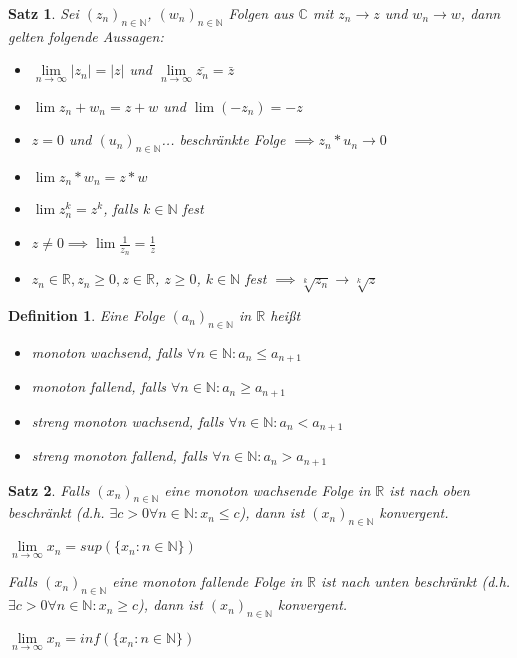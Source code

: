 \documentclass[twocolumn]{article}
\newtheorem{theorem}{Satz}[section]
\newtheorem{definition}{Definition}[section]
\begin{document}
\begin{theorem}
	Sei $(z_n)_{n \in \mathbb{N}}$, $(w_n)_{n \in \mathbb{N}}$ Folgen aus $\mathbb{C}$ mit $z_n \rightarrow z$ und $w_n \rightarrow w$, dann gelten folgende Aussagen:
	
	\begin{itemize}
		\item $\lim\limits_{n\rightarrow \infty}|z_n|=|z|$ und $\lim\limits_{n\rightarrow \infty}\bar{z_n}=\bar{z}$
		
		\item $\lim z_n + w_n = z+w$ und $\lim (-z_n)=-z$
		
		\item $z = 0$ und $(u_n)_{n \in \mathbb{N}}$... beschränkte Folge $\implies z_n * u_n \rightarrow 0$
		
		\item $\lim z_n * w_n = z*w$
		
		\item $\lim z_n^k = z^k$, falls $k \in \mathbb{N}$ fest
		
		\item $z \neq 0 \implies \lim \frac{1}{z_n}=\frac{1}{z}$
		
		\item $z_n \in \mathbb{R}, z_n \geq 0, z \in \mathbb{R}$, $z \geq 0$, $k \in \mathbb{N}$ fest $\implies \sqrt[k]{z_n}\rightarrow \sqrt[k]{z}$
	\end{itemize}
\end{theorem}

\begin{definition}
	Eine Folge $(a_n)_{n \in \mathbb{N}}$ in $\mathbb{R}$ heißt
	
	\begin{itemize}
		\item monoton wachsend, falls $\forall n \in \mathbb{N} : a_n \leq a_{n+1}$
		\item monoton fallend, falls $\forall n \in \mathbb{N} : a_n \geq a_{n+1}$
		\item streng monoton wachsend, falls $\forall n \in \mathbb{N} : a_n < a_{n+1}$
		\item streng monoton fallend, falls $\forall n \in \mathbb{N} : a_n > a_{n+1}$
	\end{itemize}
\end{definition}

\begin{theorem}
	Falls $(x_n)_{n \in \mathbb{N}}$ eine monoton wachsende Folge in $\mathbb{R}$ ist nach oben beschränkt (d.h. $\exists c > 0 \forall n \in \mathbb{N} : x_n \leq c$), dann ist $(x_n)_{n \in \mathbb{N}}$ konvergent.
	
	$\lim\limits_{n \rightarrow \infty}x_n=sup(\{x_n : n \in \mathbb{N}\})$
	
	Falls $(x_n)_{n \in \mathbb{N}}$ eine monoton fallende Folge in $\mathbb{R}$ ist nach unten beschränkt (d.h. $\exists c > 0 \forall n \in \mathbb{N} : x_n \geq c$), dann ist $(x_n)_{n \in \mathbb{N}}$ konvergent.
	
	$\lim\limits_{n \rightarrow \infty}x_n=inf(\{x_n : n \in \mathbb{N}\})$
\end{theorem}
\end{document}
